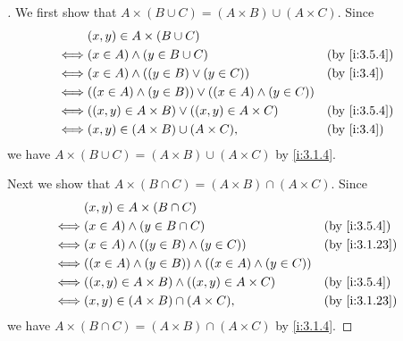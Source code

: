 \begin{proof}[]
  We first show that \(A \times (B \cup C) = (A \times B) \cup (A \times C)\).
  Since
  \begin{align*}
         & (x, y) \in A \times (B \cup C)                                                 \\
    \iff & (x \in A) \land (y \in B \cup C)                             &  & \by{i:3.5.4} \\
    \iff & (x \in A) \land ((y \in B) \lor (y \in C))                   &  & \by{i:3.4}   \\
    \iff & ((x \in A) \land (y \in B)) \lor ((x \in A) \land (y \in C))                   \\
    \iff & ((x, y) \in A \times B) \lor ((x, y) \in A \times C)         &  & \by{i:3.5.4} \\
    \iff & (x, y) \in (A \times B) \cup (A \times C),                   &  & \by{i:3.4}
  \end{align*}
  we have \(A \times (B \cup C) = (A \times B) \cup (A \times C)\) by \cref{i:3.1.4}.

  Next we show that \(A \times (B \cap C) = (A \times B) \cap (A \times C)\).
  Since
  \begin{align*}
         & (x, y) \in A \times (B \cap C)                                                   \\
    \iff & (x \in A) \land (y \in B \cap C)                              &  & \by{i:3.5.4}  \\
    \iff & (x \in A) \land ((y \in B) \land (y \in C))                   &  & \by{i:3.1.23} \\
    \iff & ((x \in A) \land (y \in B)) \land ((x \in A) \land (y \in C))                    \\
    \iff & ((x, y) \in A \times B) \land ((x, y) \in A \times C)         &  & \by{i:3.5.4}  \\
    \iff & (x, y) \in (A \times B) \cap (A \times C),                    &  & \by{i:3.1.23}
  \end{align*}
  we have \(A \times (B \cap C) = (A \times B) \cap (A \times C)\) by \cref{i:3.1.4}.


\end{proof}
